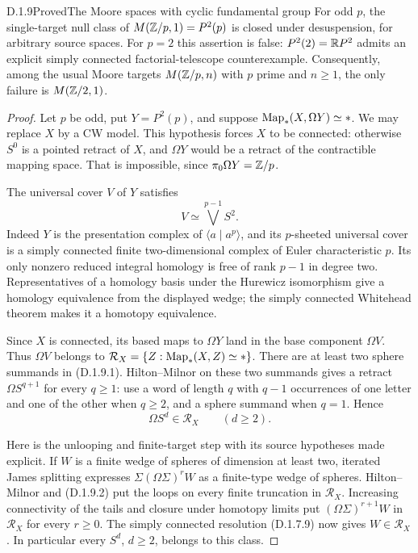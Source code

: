 \begin{claim}{D.1.9}{Proved}{The Moore spaces with cyclic fundamental group}
For odd $p$, the single-target null class of
$M(\mathbb Z/p,1)=P^2(p)$ is closed under desuspension, for arbitrary
source spaces. For $p=2$ this assertion is false:
$P^2(2)=\mathbb{R}P^2$ admits an explicit simply connected
factorial-telescope counterexample. Consequently, among the
usual Moore targets $M(\mathbb Z/p,n)$ with $p$ prime and $n\geq1$,
the only failure is $M(\mathbb Z/2,1)$.
\end{claim}
\begin{proof}
Let $p$ be odd, put $Y=P^2(p)$, and suppose
$\operatorname{Map}_*(X,\Omega Y)\simeq *$. We may replace $X$ by a CW
model. This hypothesis forces $X$ to be connected: otherwise
$S^0$ is a pointed retract of $X$, and $\Omega Y$ would be a
retract of the contractible mapping space. That is impossible,
since $\pi_0\Omega Y=\mathbb Z/p$.

The universal cover $V$ of $Y$ satisfies
\[
                         V\simeq\bigvee^{p-1}S^2.
 \tag{D.1.9.1}
\]
Indeed $Y$ is the presentation complex of $\langle a\mid a^p\rangle$,
and its $p$-sheeted universal cover is a simply connected finite
two-dimensional complex of Euler characteristic $p$. Its only
nonzero reduced integral homology is free of rank $p-1$ in degree
two. Representatives of a homology basis under the Hurewicz
isomorphism give a homology equivalence from the displayed wedge;
the simply connected Whitehead theorem makes it a homotopy
equivalence.

Since $X$ is connected, its based maps to $\Omega Y$ land in
the base component $\Omega V$. Thus $\Omega V$ belongs to
$\mathcal R_X=\{Z:\operatorname{Map}_*(X,Z)\simeq *\}$.
There are at least two sphere summands in (D.1.9.1).
Hilton--Milnor on these two summands gives a retract
$\Omega S^{q+1}$ for every $q\geq1$: use a word of length
$q$ with $q-1$ occurrences of one letter and one of the other
when $q\geq2$, and a sphere summand when $q=1$.
Hence
\[
                      \Omega S^d\in\mathcal R_X
                      \qquad(d\geq2).              \tag{D.1.9.2}
\]

Here is the unlooping and finite-target step with its source
hypotheses made explicit. If $W$ is a finite wedge of spheres
of dimension at least two, iterated James splitting expresses
$\Sigma(\Omega\Sigma)^rW$ as a finite-type wedge of spheres.
Hilton--Milnor and (D.1.9.2) put the loops on every finite
truncation in $\mathcal R_X$. Increasing connectivity of the
tails and closure under homotopy limits put
$(\Omega\Sigma)^{r+1}W$ in $\mathcal R_X$ for every $r\geq0$.
The simply connected resolution (D.1.7.9) now gives
$W\in\mathcal R_X$. In particular every $S^d$, $d\geq2$,
belongs to this class.


\end{proof}
